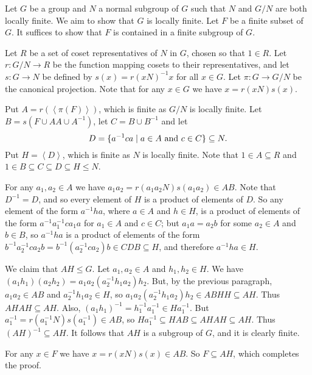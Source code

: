 \documentclass[12pt]{article}
\def\genby#1{{\left\langle #1\right\rangle}}
\def\subgroup{\leq}
\begin{document}

Let $G$ be a group and $N$ a normal subgroup of $G$
such that $N$ and $G/N$ are both locally finite.
We aim to show that $G$ is locally finite.
Let $F$ be a finite subset of $G$.
It suffices to show that $F$ is contained in a finite subgroup of $G$.

Let $R$ be a set of coset representatives of $N$ in $G$,
chosen so that $1\in R$.
Let $r\colon G/N\to R$ be the function mapping cosets to their representatives,
and let $s\colon G\to N$ be defined by $s(x)=r(xN)^{-1}x$ for all $x\in G$.
Let $\pi\colon G\to G/N$ be the canonical projection.
Note that for any $x\in G$ we have $x=r(xN)s(x)$.

Put $A=r(\genby{\pi(F)})$, which is finite as $G/N$ is locally finite.
Let $B=s(F\cup AA\cup A^{-1})$, let $C=B\cup B^{-1}$
and let $$D=\{a^{-1}ca\mid a\in A\hbox{ and }c\in C\}\subseteq N.$$
Put $H=\genby{D}$, which is finite as $N$ is locally finite.
Note that $1\in A\subseteq R$
and $1\in B\subseteq C\subseteq D\subseteq H\subgroup N$.

For any $a_1,a_2\in A$ we have $a_1a_2=r(a_1a_2N)s(a_1a_2)\in AB$.
Note that $D^{-1}=D$,
and so every element of $H$ is a product of elements of $D$.
So any element of the form $a^{-1}ha$, where $a\in A$ and $h\in H$,
is a product of elements of the form $a^{-1}a_1^{-1}ca_1a$
for $a_1\in A$ and $c\in C$;
but $a_1a=a_2b$ for some $a_2\in A$ and $b\in B$,
so $a^{-1}ha$ is a product of elements of the form 
$b^{-1}a_2^{-1}ca_2b=b^{-1}(a_2^{-1}ca_2)b\in CDB\subseteq H$,
and therefore $a^{-1}ha\in H$.

We claim that $AH\subgroup G$.
Let $a_1,a_2\in A$ and $h_1,h_2\in H$.
We have $(a_1h_1)(a_2h_2)=a_1a_2(a_2^{-1}h_1a_2)h_2$.
But, by the previous paragraph, $a_1a_2\in AB$ and $a_2^{-1}h_1a_2\in H$,
so $a_1a_2(a_2^{-1}h_1a_2)h_2\in ABHH\subseteq AH$.
Thus $AHAH\subseteq AH$.
Also, $(a_1h_1)^{-1}=h_1^{-1}a_1^{-1}\in Ha_1^{-1}$.
But $a_1^{-1}=r(a_1^{-1}N)s(a_1^{-1})\in AB$,
so $Ha_1^{-1}\subseteq HAB\subseteq AHAH\subseteq AH$.
Thus $(AH)^{-1}\subseteq AH$.
It follows that $AH$ is a subgroup of $G$, and it is clearly finite.

For any $x\in F$ we have $x=r(xN)s(x)\in AB$.
So $F\subseteq AH$, which completes the proof.
\end{document}
